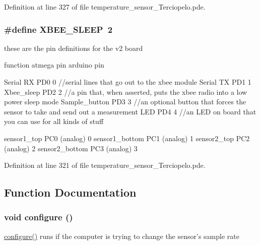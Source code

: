 Definition at line 327 of file temperature\_\-sensor\_\-Terciopelo.pde.\hypertarget{temperature__sensor___terciopelo_8pde_658c2878485cfe5cc625d283a6d34bc1}{
\subsubsection[{XBEE\_\-SLEEP}]{\setlength{\rightskip}{0pt plus 5cm}\#define XBEE\_\-SLEEP~2}}
\label{temperature__sensor___terciopelo_8pde_658c2878485cfe5cc625d283a6d34bc1}


these are the pin definitions for the v2 board

function atmega pin arduino pin

Serial RX PD0 0 //serial lines that go out to the xbee module Serial TX PD1 1 Xbee\_\-sleep PD2 2 //a pin that, when asserted, puts the xbee radio into a low power sleep mode Sample\_\-button PD3 3 //an optional button that forces the sensor to take and send out a measurement LED PD4 4 //an LED on board that you can use for all kinds of stuff

sensor1\_\-top PC0 (analog) 0 sensor1\_\-bottom PC1 (analog) 1 sensor2\_\-top PC2 (analog) 2 sensor2\_\-bottom PC3 (analog) 3 

Definition at line 321 of file temperature\_\-sensor\_\-Terciopelo.pde.

\subsection{Function Documentation}
\hypertarget{temperature__sensor___terciopelo_8pde_e369b3765489ee8bd0ea791c1843630f}{
\subsubsection[{configure}]{\setlength{\rightskip}{0pt plus 5cm}void configure ()}}
\label{temperature__sensor___terciopelo_8pde_e369b3765489ee8bd0ea791c1843630f}


\hyperlink{nublogger_8h_e369b3765489ee8bd0ea791c1843630f}{configure()} runs if the computer is trying to change the sensor's sample rate 

